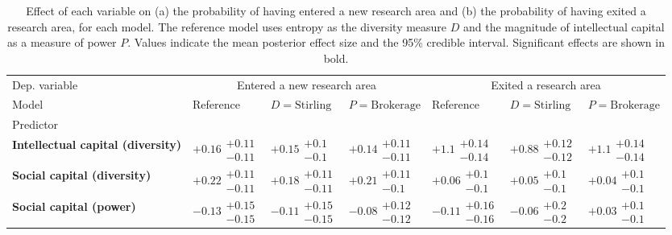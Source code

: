 \begin{table}[H]
\centering
\caption{Effect of each variable on (a) the probability of having entered a new research area and (b) the probability of having exited a research area, for each model. The reference model uses entropy as the diversity measure $D$ and the magnitude of intellectual capital as a measure of power $P$. Values indicate the mean posterior effect size and the 95\% credible interval. Significant effects are shown in bold.}
\label{table:summary_entered_exited}
\renewcommand{\arraystretch}{2}\fontsize{6}{7}\selectfont\begin{tabular}{lllllll}
\toprule
Dep. variable & \multicolumn{3}{c}{Entered a new research area} & \multicolumn{3}{c}{Exited a research area} \\
Model &                              Reference &                    $D=\text{Stirling}$ &                   $P=\text{Brokerage}$ &                              Reference &                    $D=\text{Stirling}$ &                   $P=\text{Brokerage}$ \\
Predictor                                 &                                        &                                        &                                        &                                        &                                        &                                        \\
\midrule
\textbf{Intellectual capital (diversity)} &  $\bm{+0.16}\substack{+0.11 \\ -0.11}$ &    $\bm{+0.15}\substack{+0.1 \\ -0.1}$ &  $\bm{+0.14}\substack{+0.11 \\ -0.11}$ &   $\bm{+1.1}\substack{+0.14 \\ -0.14}$ &  $\bm{+0.88}\substack{+0.12 \\ -0.12}$ &   $\bm{+1.1}\substack{+0.14 \\ -0.14}$ \\
\textbf{Social capital (diversity)}       &  $\bm{+0.22}\substack{+0.11 \\ -0.11}$ &  $\bm{+0.18}\substack{+0.11 \\ -0.11}$ &   $\bm{+0.21}\substack{+0.11 \\ -0.1}$ &         $+0.06\substack{+0.1 \\ -0.1}$ &         $+0.05\substack{+0.1 \\ -0.1}$ &         $+0.04\substack{+0.1 \\ -0.1}$ \\
\textbf{Social capital (power)}           &       $-0.13\substack{+0.15 \\ -0.15}$ &       $-0.11\substack{+0.15 \\ -0.15}$ &       $-0.08\substack{+0.12 \\ -0.12}$ &       $-0.11\substack{+0.16 \\ -0.16}$ &         $-0.06\substack{+0.2 \\ -0.2}$ &         $+0.03\substack{+0.1 \\ -0.1}$ \\

\end{tabular}
\end{table}
